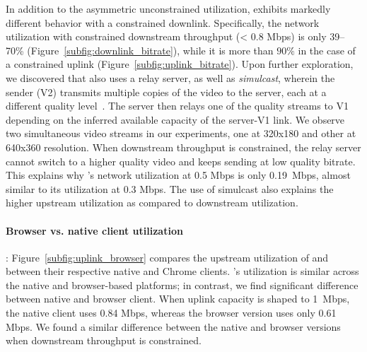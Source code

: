 In addition to the asymmetric unconstrained utilization, \meet exhibits
markedly different behavior with a constrained downlink.
Specifically, the
network utilization with constrained downstream throughput (< 0.8 Mbps) is
only 39--70\%
(Figure~\ref{subfig:downlink_bitrate}), while it is more than $90\%$ in the
case of a constrained uplink (Figure~\ref{subfig:uplink_bitrate}). Upon
further exploration, we discovered that
\meet also uses a relay server, as well as
\textit{simulcast}, wherein the sender (V2) transmits multiple copies of the
video to the server, each at a different quality
level~\cite{nistico2020comparative}. The server then relays one of the quality
streams to V1 depending on the inferred available capacity of the server-V1
link. We observe two simultaneous video streams in our experiments, one at
320x180 and other at 640x360 resolution. When downstream throughput is
constrained, the relay
server cannot switch to a higher quality video and keeps sending at low
quality bitrate. This explains why \meet's network utilization at 0.5 Mbps is
only 0.19~Mbps, almost similar to its utilization at 0.3 Mbps.  The use of
simulcast also explains the higher upstream utilization as compared to
downstream utilization. 

\paragraph{Browser vs. native client utilization}:
Figure~\ref{subfig:uplink_browser} compares the upstream utilization of \zoom
and \teams between their respective native and Chrome clients. \zoom's
utilization is similar across the native and browser-based platforms; in
contrast, we find significant difference between  \teams native and browser client. When uplink capacity is shaped to 1~Mbps, the native client
uses 0.84 Mbps, whereas the browser version uses only 0.61 Mbps. We found a
similar difference between the native and browser versions when downstream
throughput is constrained. 

